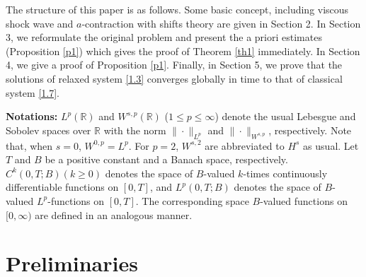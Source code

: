 \documentclass[10pt,reqno]{amsart}
\numberwithin{equation}{section}
\begin{document}
The structure of this paper is as follows. Some basic concept, including viscous shock wave and $a$-contraction with shifts theory are given in Section 2. In Section 3, we reformulate the original problem and present  the a priori estimates (Proposition \ref{p1}) which gives the proof of Theorem \ref{th1} immediately. In Section 4, we give a proof  of Proposition \ref{p1}. Finally, in Section 5, we prove that the solutions of  relaxed system \eqref{1.3} converges globally in time to  that of  classical system \eqref{1.7}.

\textbf{Notations:}  $L^p(\mathbb R)$ and $W^{s,p}(\mathbb R)$  ($1\le p \le\infty$) denote the  usual Lebesgue  and Sobolev spaces over $\mathbb R$ with the norm $\|\cdot \|_{L^p}$ and $\|\cdot\|_{W^{s,p}}$, respectively. Note that, when $s=0$, $W^{0,p}=L^p$. For $p=2$, $W^{s, 2}$ are abbreviated to $H^s$ as usual.
Let $T$ and $B$ be a positive constant and a Banach space, respectively. $C^k(0,T; B)(k \ge 0 )$ denotes the space of $B$-valued $k$-times continuously differentiable functions on $[0,T]$, and $L^p(0,T; B)$ denotes the space of $B$-valued $L^p$-functions on $[0,T]$. The corresponding space $B$-valued functions on $[0,\infty)$ are defined in an analogous manner.

\section{Preliminaries}
\end{document}
